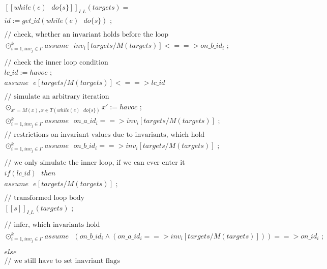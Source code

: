 \documentclass[a4paper,12pt]{article}
\begin{document}
	\vspace*{-3.5cm}
	\begin{equation*}
	\begin{multlined}
		[[while(e) \text{ } do\{s\}]]_{I\_L}(targets) = \\
		id := get\_id(while(e) \text{ } do\{s\}) \text{ ;} \\
		\\
		\text{// check, 
			whether an invariant holds before the loop} \\
		\odot^k_{i=1, inv_j \in I'} assume \text{ } 
		inv_i[targets / M(targets)] <==> on\_b\_id_i \text{ ;} \\
		\\
		\text{// check the inner loop condition} \\
		lc\_id := havoc \text{ ;} \\
		assume \text{ } 
		e[targets / M(targets)] <==> lc\_id \\
		\\
		\text{// simulate an arbitrary iteration} \\
		\odot_{x' = M(x), x \in T(while(e) \text{ } do\{s\})}
		x' := havoc \text{ ;} \\
		\odot^k_{i=1, inv_j \in I'} 
		assume \text{ } on\_a\_id_i ==> 
		inv_i[targets / M(targets)] \text{ ;} \\
		\text{// restrictions on invariant values 
			due to invariants, which hold} \\
		\odot^k_{i=1, inv_j \in I'} 
		assume \text{ } on\_b\_id_i ==> 
		inv_i[targets / M(targets)] \text{ ;} \\
		\\
		\text{// we only simulate the inner loop,
			if we can ever enter it} \\
		if(lc\_id) \text{ } then \\
		assume \text{ } e[targets / M(targets)] \text{ ;} \\
		\\
		\text{// transformed loop body} \\
		[[s]]_{I\_L}(targets) \text{ ;} \\
		\\		
		\text{// infer, which invariants hold} \\
		\odot^k_{i=1, inv_j \in I'} 
		assume \text{ }
		(on\_b\_id_i \land 
		(on\_a\_id_i ==> inv_i[targets / M(targets)])) 
		==> on\_id_i \text{ ;} \\
		\\
		else \\
		\text{// we still have to set inavriant flags} \\

\end{multlined}
\end{equation*}
\end{document}
